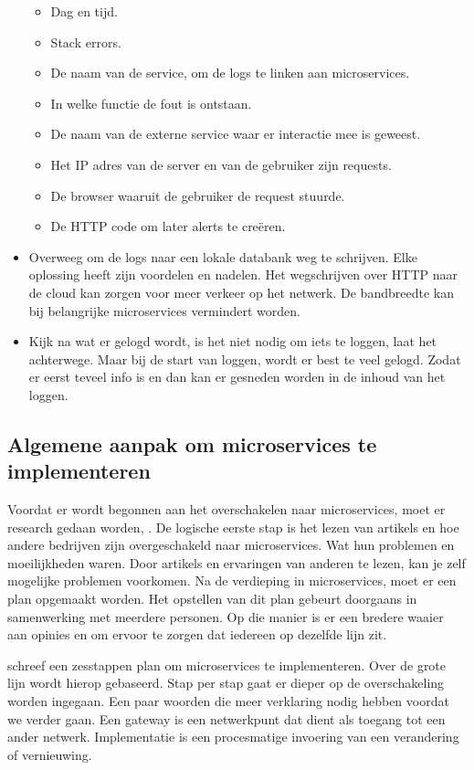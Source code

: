 \begin{itemize}
		\begin{itemize}
			\item Dag en tijd.
			\item Stack errors.
			\item De naam van de service, om de logs te linken aan microservices.
			\item In  welke functie de fout is ontstaan.
			\item De naam van de externe service waar er interactie mee is geweest.
			\item Het IP adres van de server en van de gebruiker zijn requests. 
			\item De browser waaruit de gebruiker de request stuurde.
			\item De HTTP code om later alerts te creëren. 
		\end{itemize}
	\item Overweeg om de logs naar een lokale databank  weg te schrijven. Elke oplossing heeft zijn voordelen en nadelen. Het  wegschrijven over HTTP naar de cloud kan zorgen voor meer verkeer op het netwerk. De bandbreedte kan bij belangrijke microservices vermindert worden. 
	\item Kijk na wat er gelogd wordt, is het niet nodig om iets te loggen, laat het achterwege. Maar bij de start van loggen, wordt er best te veel gelogd. Zodat er eerst teveel info is en dan kan er gesneden worden in de inhoud van het loggen.
\end{itemize}



\subsection{Algemene aanpak om microservices te implementeren}
Voordat er wordt begonnen aan het overschakelen naar microservices, moet er research gedaan worden, \textcite{Koukia2018}. De logische eerste stap is het lezen van artikels en hoe andere bedrijven zijn overgeschakeld naar microservices. Wat hun problemen en moeilijkheden waren. Door artikels en ervaringen van anderen te lezen, kan je zelf mogelijke problemen voorkomen. Na de verdieping in microservices, moet er een plan opgemaakt worden. Het opstellen van dit plan gebeurt doorgaans in samenwerking met meerdere personen. Op die manier is er een bredere waaier aan opinies en om ervoor te zorgen dat iedereen op dezelfde lijn zit.


\textcite{Benetis2016} schreef een zesstappen plan om microservices te implementeren. Over de grote lijn wordt hierop gebaseerd. Stap per stap gaat er dieper op de overschakeling worden ingegaan.
Een paar woorden die meer verklaring nodig hebben voordat  we  verder gaan. Een gateway is een netwerkpunt dat dient als toegang tot een ander netwerk.
Implementatie is een procesmatige invoering van een verandering of vernieuwing. 

